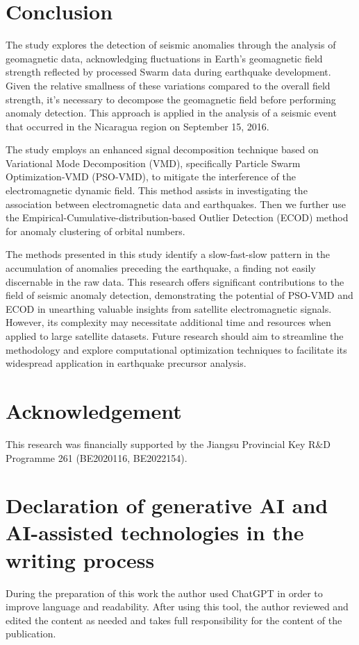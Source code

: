 \documentclass[3p,authoryear,preprint,12pt]{elsarticle}
\begin{document}
\section{Conclusion}

{The study explores the detection of seismic anomalies through the analysis of geomagnetic data, acknowledging fluctuations in Earth's geomagnetic field strength reflected by processed Swarm data during earthquake development.} Given the relative smallness of these variations compared to the overall field strength, it's necessary to decompose the geomagnetic field before performing anomaly detection. This approach is applied in the analysis of a seismic event that occurred in the Nicaragua region on September 15, 2016.

The study employs an enhanced signal decomposition technique based on Variational Mode Decomposition (VMD), specifically Particle Swarm Optimization-VMD (PSO-VMD), to mitigate the interference of the electromagnetic dynamic field. This method assists in investigating the association between electromagnetic data and earthquakes. Then we further use the Empirical-Cumulative-distribution-based Outlier Detection (ECOD) method for anomaly clustering of orbital numbers.

The methods presented in this study {identify} a slow-fast-slow pattern in the accumulation of anomalies preceding the earthquake, a finding not easily discernable in the raw data. This research offers significant contributions to the field of seismic anomaly detection, demonstrating the potential of PSO-VMD and ECOD in unearthing valuable insights from satellite electromagnetic signals. {However, its complexity may necessitate additional time and resources when applied to large satellite datasets. Future research should aim to streamline the methodology and explore computational optimization techniques to facilitate its widespread application in earthquake precursor analysis.}
\section{Acknowledgement}
This research was financially supported by the Jiangsu Provincial Key R$\&$D Programme 261{ }(BE2020116, BE2022154).
    
\section{Declaration of generative AI and AI-assisted technologies in the writing process}

During the preparation of this work the author used ChatGPT in order to improve language and readability. After using this tool, the author reviewed and edited the content as needed and takes full responsibility for the content of the publication.

%

\end{document}
